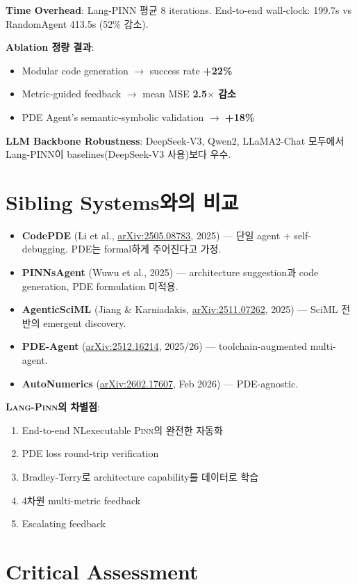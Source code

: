 \documentclass[11pt,a4paper,oneside]{report}
\newcommand{\pinn}{\textsc{Pinn}}
\newcommand{\langpinn}{\textsc{Lang-Pinn}}
\newcommand{\arxivid}[1]{\href{https://arxiv.org/abs/#1}{arXiv:#1}}
\begin{document}
\textbf{Time Overhead}: Lang-PINN 평균 8 iterations. End-to-end wall-clock: 199.7s vs RandomAgent 413.5s (52\% 감소).

\textbf{Ablation 정량 결과}:
\begin{itemize}
\item Modular code generation $\rightarrow$ success rate \textbf{+22\%}
\item Metric-guided feedback $\rightarrow$ mean MSE \textbf{2.5$\times$ 감소}
\item PDE Agent's semantic-symbolic validation $\rightarrow$ \textbf{+18\%}
\end{itemize}

\textbf{LLM Backbone Robustness}: DeepSeek-V3, Qwen2, LLaMA2-Chat 모두에서 Lang-PINN이 baselines(DeepSeek-V3 사용)보다 우수.

\section{Sibling Systems와의 비교}

\begin{itemize}
\item \textbf{CodePDE} (Li et al., \arxivid{2505.08783}, 2025) --- 단일 agent + self-debugging. PDE는 formal하게 주어진다고 가정.
\item \textbf{PINNsAgent} (Wuwu et al., 2025) --- architecture suggestion과 code generation, PDE formulation 미적용.
\item \textbf{AgenticSciML} (Jiang \& Karniadakis, \arxivid{2511.07262}, 2025) --- SciML 전반의 emergent discovery.
\item \textbf{PDE-Agent} (\arxivid{2512.16214}, 2025/26) --- toolchain-augmented multi-agent.
\item \textbf{AutoNumerics} (\arxivid{2602.17607}, Feb 2026) --- PDE-agnostic.
\end{itemize}

\textbf{\langpinn{}의 차별점}:
\begin{enumerate}
\item End-to-end NL\textrightarrow{}executable \pinn{}의 완전한 자동화
\item PDE loss round-trip verification
\item Bradley-Terry로 architecture capability를 데이터로 학습
\item 4차원 multi-metric feedback
\item Escalating feedback
\end{enumerate}

\section{Critical Assessment}
\end{document}
